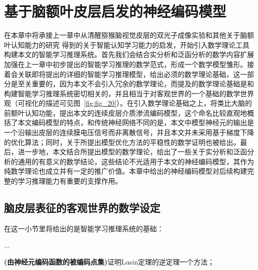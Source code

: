 

\chapter{基于脑额叶皮层启发的神经编码模型}
\label{cha:intro}

在本章中将承接上一章中从清醒猕猴脑视觉皮层的双光子成像实验和其他关于脑额叶认知能力的研究    得到的关于智能认知学习能力的启发，开始引入数学理论工具构建本文的智能学习推理系统。首先我们会结合实分析和泛函分析的数学内容扩展加强在上一章中初步提出的智能学习推理的数学范式，形成一个数学模型雏形。接着会关联即将提出的详细的智能学习推理模型，给出必须的数学理论基础，这一部分是至关重要的，因为本文不会引入冗余的数学理论，而提及的数学理论基础是和构建智能学习推理系统密切相关的，并且相当于对客观世界的一个基础的数学世界观（可视化的描述可见图~\ref{fig:fig_20}）。在引入数学理论基础之上，将类比大脑的前额叶认知功能，提出本文的连续皮层介质渗流编码模型，这个命名比较直观地概括了本文编码模型的特点，和传统神经网络不同的是，本文中模型神经元的输出是一个沿输出皮层的连续膜电压信号而非离散信号，并且本文并未采用基于梯度下降的优化算法；同时，关于所提出模型优化方法的平稳性的数学证明也被给出。最后，进一步地，本文结合所提出模型的数学理论，给出了一些关于实分析和泛函分析的通用的有意义的数学结论，这些结论不光适用于本文的神经编码模型，其作为纯数学理论也成立并有一定的推广价值。本章中给出的神经编码模型对后续构建完整的学习推理能力有重要的支撑作用。


  
\section{脑皮层表征的客观世界的数学设定}
在这一小节里将给出的是智能学习推理系统的基础：


...



\begin{thm}
\textbf{(由神经元编码函数的被编码点集)}证明Lusin定理的逆定理一个方法；
\end{thm}

